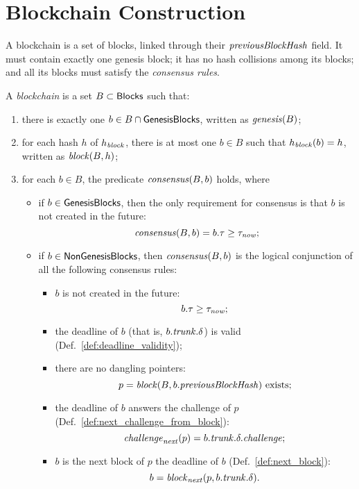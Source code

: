 \section{Blockchain Construction}\label{sec:blockchain_construction}

A blockchain is a set of blocks, linked through their ${\mathit{previousBlockHash}}$ field.
It must contain exactly one genesis block; it has no hash collisions among its blocks;
and all its blocks must satisfy the \emph{consensus rules}.
%
\begin{definition}\label{def:blockchain}
  A \emph{blockchain} is a set $B\subset{\mathsf{Blocks}}$ such that:
  \begin{enumerate}
  \item there is exactly one $b\in B\cap{\mathsf{GenesisBlocks}}$, written as ${\mathit{genesis}}(B)$;
  \item for each hash $h$ of $h_{\mathit{block}}$, there is at most
    one $b\in B$ such that $h_{\mathit{block}}(b)=h$, written as ${\mathit{block}}(B,h)$;
  \item for each $b\in B$, the predicate ${\mathit{consensus}}(B,b)$ holds, where
    \begin{itemize}
    \item if $b\in{\mathsf{GenesisBlocks}}$, then the only requirement for consensus is that
      $b$ is not created in the future:
      \[
      {\mathit{consensus}}(B,b)=b.\tau\ge\tau_{\mathit{now}};
      \]
    \item if $b\in{\mathsf{NonGenesisBlocks}}$, then ${\mathit{consensus}}(B,b)$ is the logical conjunction
      of all the following consensus rules:
      \begin{itemize}
      \item $b$ is not created in the future:
        \[
        b.\tau\ge\tau_{\mathit{now}};
        \]
      \item the deadline of $b$ (that is, $b.{\mathit{trunk}}.\delta$) is valid (Def.~\ref{def:deadline_validity});
      \item there are no dangling pointers:
        \[
        p={\mathit{block}}(B,b.{\mathit{previousBlockHash}})\text{ exists;}
        \]
      \item the deadline of $b$ answers the challenge of $p$ (Def.~\ref{def:next_challenge_from_block}):
        \[
        {\mathit{challenge}}_{\mathit{next}}(p)=b.{\mathit{trunk}}.\delta.{\mathit{challenge}};
        \]
      \item $b$ is the next block of $p$ \wrt the deadline of $b$ (Def.~\ref{def:next_block}):
        \[
        b={\mathit{block}}_{\mathit{next}}(p,b.{\mathit{trunk}}.\delta).
        \]
      \end{itemize}
    \end{itemize}
  \end{enumerate}
\end{definition}
